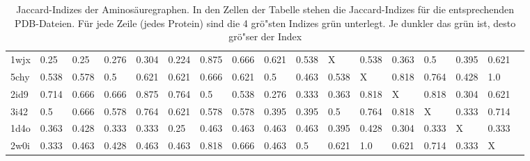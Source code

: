 \documentclass{report}
\begin{document}
\begin{table}
{\begin{tabular}{l l l l l l l l l l l l l l l l l}
1wjx & 0.25 & 0.25 & 0.276 & 0.304 & 0.224 & \cellcolor{fGreen!100}0.875 & \cellcolor{fGreen!75}0.666 & \cellcolor{fGreen!50}0.621 & 0.538 &   X   & 0.538 & 0.363 & 0.5 & 0.395 & \cellcolor{fGreen!25}0.621 &  \\
5chy & 0.538 & 0.578 & 0.5 & 0.621 & 0.621 & \cellcolor{fGreen!25}0.666 & 0.621 & 0.5 & 0.463 & 0.538 &   X   & \cellcolor{fGreen!75}0.818 & \cellcolor{fGreen!50}0.764 & 0.428 & \cellcolor{fGreen!100}1.0 &  \\
2id9 & 0.714 & 0.666 & 0.666 & \cellcolor{fGreen!100}0.875 & \cellcolor{fGreen!25}0.764 & 0.5 & 0.538 & 0.276 & 0.333 & 0.363 & \cellcolor{fGreen!75}0.818 &   X   & \cellcolor{fGreen!50}0.818 & 0.304 & 0.621 &  \\
3i42 & 0.5 & 0.666 & 0.578 & \cellcolor{fGreen!50}0.764 & 0.621 & 0.578 & 0.578 & 0.395 & 0.395 & 0.5 & \cellcolor{fGreen!75}0.764 & \cellcolor{fGreen!100}0.818 &   X   & 0.333 & \cellcolor{fGreen!25}0.714 &  \\
1d4o & 0.363 & 0.428 & 0.333 & 0.333 & 0.25 & \cellcolor{fGreen!25}0.463 & \cellcolor{fGreen!50}0.463 & \cellcolor{fGreen!100}0.463 & \cellcolor{fGreen!75}0.463 & 0.395 & 0.428 & 0.304 & 0.333 &   X   & 0.333 &  \\
2w0i & 0.333 & 0.463 & 0.428 & 0.463 & 0.463 & \cellcolor{fGreen!75}0.818 & \cellcolor{fGreen!25}0.666 & 0.463 & 0.5 & 0.621 & \cellcolor{fGreen!100}1.0 & 0.621 & \cellcolor{fGreen!50}0.714 & 0.333 &   X   &  \\


\end{tabular}}
\caption{Jaccard-Indizes der Aminos\"auregraphen. In den Zellen der Tabelle stehen die Jaccard-Indizes f\"ur die entsprechenden PDB-Dateien. F\"ur jede Zeile (jedes Protein) sind die 4 gr\"o"sten Indizes gr\"un unterlegt. Je dunkler das gr\"un ist, desto gr\"o"ser der Index}
\end{table}
\end{document}
